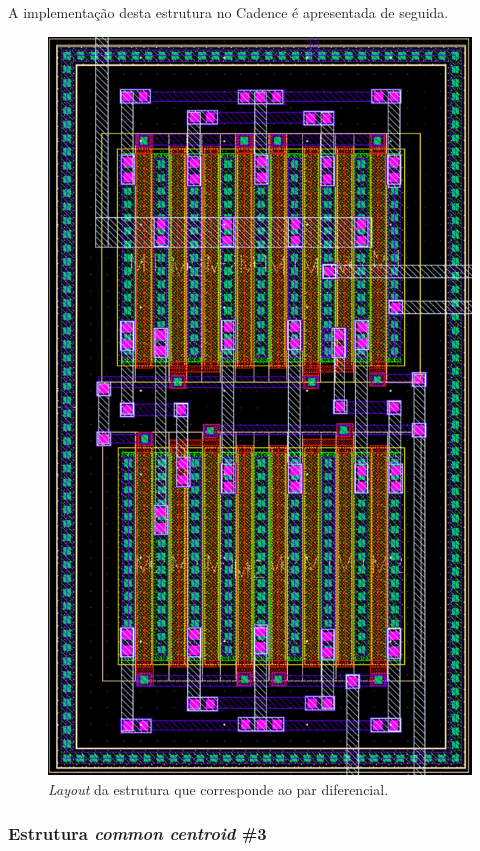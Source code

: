 \documentclass[11pt]{article}
\numberwithin{equation}{section}
\begin{document}
A implementação desta estrutura no Cadence é apresentada de seguida.

\begin{figure}[H]
	\centering
	\includegraphics[keepaspectratio=true, scale=0.65]{exps/layout/pardiferencial}
	\vspace{-0.5em}
	\caption{\textit{Layout} da estrutura que corresponde ao par diferencial.}
	\vspace{-0.8em}
\end{figure}

\subsubsection{Estrutura \textit{common centroid} \#3}
\end{document}
